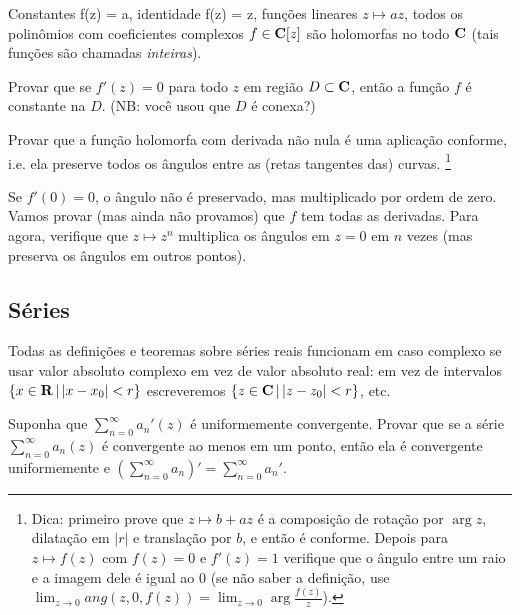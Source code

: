 \begin{exem}
Constantes f(z) = a,
identidade f(z) = z,
funções lineares $z \mapsto a z$,
todos os polinômios com coeficientes complexos $f \in \mathbf{C}[z]$
são holomorfas no todo $\mathbf{C}$ (tais funções são chamadas \emph{inteiras}).
\end{exem}

\begin{problema}
Provar que se $f'(z)=0$ para todo $z$ em região $D\subset \mathbf{C}$, então a função $f$ é constante na $D$.
(NB: você usou que $D$ é conexa?)
\end{problema}

\begin{problema}
Provar que a função holomorfa com derivada não nula é uma aplicação conforme,
i.e. ela preserve todos os ângulos entre as (retas tangentes das) curvas.
\footnote{
Dica: primeiro prove que $z \mapsto b+ a z$ é a composição de rotação por $\arg z$, dilatação em $|r|$
e translação por $b$, e então é conforme.
Depois para $z \mapsto f(z)$ com $f(z) = 0$ e $f'(z)=1$ verifique que o ângulo entre um raio e a imagem dele
é igual ao $0$ (se não saber a definição, use $\lim_{z\to 0} ang(z,0,f(z)) = \lim_{z\to 0} \arg \frac{f(z)}{z}$).
}
\end{problema}

Se $f'(0)=0$, o ângulo não é preservado, mas multiplicado por ordem de zero. Vamos provar (mas ainda não provamos) que $f$ tem todas as derivadas. Para agora, verifique que $z\mapsto z^n$ multiplica os ângulos em $z=0$ em $n$ vezes
(mas preserva os ângulos em outros pontos).

\subsection{Séries}

Todas as definições e teoremas sobre séries reais funcionam em caso complexo
se usar valor absoluto complexo em vez de valor absoluto real:
em vez de intervalos $\{x\in \mathbf{R}\,|\,|x-x_0|<r\}$ escreveremos $\{z\in \mathbf{C}\,|\,|z-z_0|<r\}$, etc.

\begin{problema}
Suponha que $\sum_{n=0}^\infty a_n'(z)$ é uniformemente convergente.
Provar que se a série $\sum_{n=0}^\infty a_n(z)$ é convergente ao menos em um ponto,
então ela é convergente uniformemente e $(\sum_{n=0}^\infty a_n)' = \sum_{n=0}^\infty a_n'$.
\end{problema}

